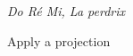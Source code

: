 \documentclass[preview]{standalone}
\begin{document}
\begin{center}
\emph{Do Ré Mi, La perdrix}

Apply a projection
\end{center}
\end{document}
